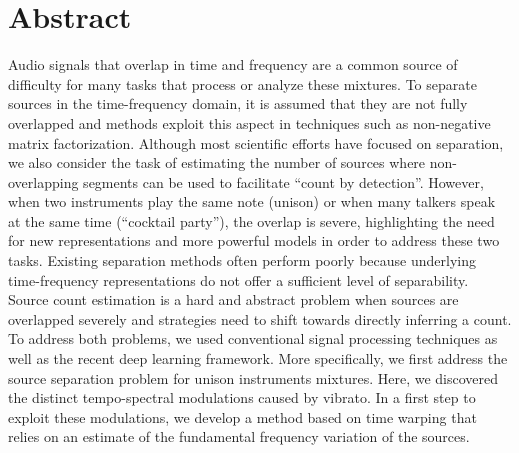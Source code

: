 \begingroup
\let\clearpage\relax
\let\cleardoublepage\relax
\let\cleardoublepage\relax

\chapter*{Abstract}
Audio signals that overlap in time and frequency are a common source of difficulty for many tasks that process or analyze these mixtures.
To separate sources in the time-frequency domain, it is assumed that they are not fully overlapped and methods exploit this aspect in techniques such as non-negative matrix factorization.
Although most scientific efforts have focused on separation, we also consider the task of estimating the number of sources where non-overlapping segments can be used to facilitate ``count by detection''.
However, when two instruments play the same note (unison) or when many talkers speak at the same time (``cocktail party''), the overlap is severe, highlighting the need for new representations and more powerful models in order to address these two tasks.
Existing separation methods often perform poorly because underlying time-frequency representations do not offer a sufficient level of separability.
Source count estimation is a hard and abstract problem when sources are overlapped severely and strategies need to shift towards directly inferring a count.
To address both problems, we used conventional signal processing techniques as well as the recent deep learning framework.
More specifically, we first address the source separation problem for unison instruments mixtures.
Here, we discovered the distinct tempo-spectral modulations caused by vibrato. 
In a first step to exploit these modulations, we develop a method based on time warping that relies on an estimate of the fundamental frequency variation of the sources. 
